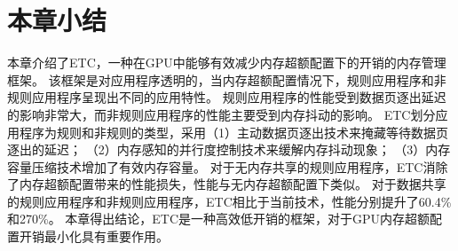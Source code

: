 \section{本章小结}
\label{sec:etcconclusion}
本章介绍了ETC，一种在GPU中能够有效减少内存超额配置下的开销的内存管理框架。
该框架是对应用程序透明的，当内存超额配置情况下，规则应用程序和非规则应用程序呈现出不同的应用特性。
规则应用程序的性能受到数据页逐出延迟的影响非常大，而非规则应用程序的性能主要受到内存抖动的影响。
ETC划分应用程序为规则和非规则的类型，采用（1）主动数据页逐出技术来掩藏等待数据页逐出的延迟；
（2）内存感知的并行度控制技术来缓解内存抖动现象；
（3）内存容量压缩技术增加了有效内存容量。
对于无内存共享的规则应用程序，ETC消除了内存超额配置带来的性能损失，性能与无内存超额配置下类似。
对于数据共享的规则应用程序和非规则应用程序，ETC相比于当前技术，性能分别提升了60.4\%和270\%。
本章得出结论，ETC是一种高效低开销的框架，对于GPU内存超额配置开销最小化具有重要作用。

